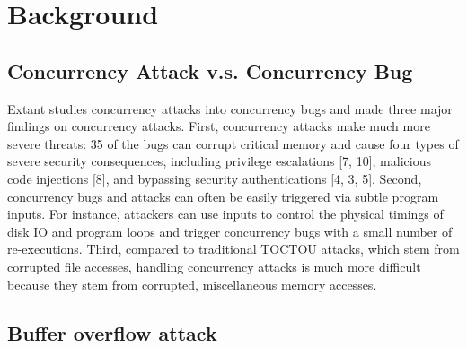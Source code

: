 \section{Background}\label{sec:background}
\subsection{Concurrency Attack v.s. Concurrency Bug}
Extant studies \cite{con:hotpar12, acidrain:sigmod17}  concurrency 
attacks into  
concurrency bugs and made three major findings on concurrency
attacks. First, concurrency attacks make much more severe threats:
35 of the bugs can corrupt critical memory and cause four
types of severe security consequences, including privilege escalations [7, 10],
malicious code injections [8], and bypassing security authentications
[4, 3, 5].
Second, concurrency bugs and attacks can often be easily
triggered via subtle program inputs. For instance, attackers
can use inputs to control the physical timings of disk
IO and program loops and trigger concurrency bugs with a
small number of re-executions. Third, compared to traditional
TOCTOU attacks, which stem from corrupted file accesses,
handling concurrency attacks is much more difficult because
they stem from corrupted, miscellaneous memory accesses.


\subsection{Buffer overflow attack}





